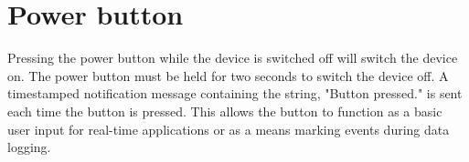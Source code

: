 \section{Power button}

Pressing the power button while the device is switched off will switch the device on.  The power button must be held for two seconds to switch the device off.  A timestamped notification message containing the string, "Button pressed." is sent each time the button is pressed.  This allows the button to function as a basic user input for real-time applications or as a means marking events during data logging.
